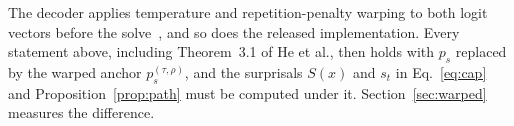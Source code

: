\begin{remark}\label{rem:warp}
The decoder applies temperature and repetition-penalty warping to both logit vectors before the solve~\cite[App.~B]{he2026anchored}, and so does the released implementation. Every statement above, including Theorem~3.1 of He et al., then holds with $p_s$ replaced by the warped anchor $p_s^{(\tau,\rho)}$, and the surprisals $S(x)$ and $s_t$ in Eq.~\eqref{eq:cap} and Proposition~\ref{prop:path} must be computed under it. Section~\ref{sec:warped} measures the difference.
\end{remark}
